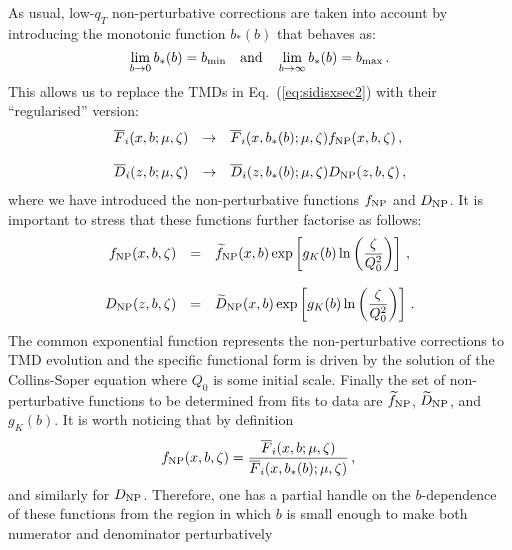 \documentclass[10pt,a4paper]{article}
\begin{document}
As usual, low-$q_T$ non-perturbative corrections are taken into
account by introducing the monotonic function $b_*(b)$ that behaves
as:
\begin{equation}
  \lim_{b\rightarrow 0}
  b_*(b) = b_{\rm min}\quad\mbox{and}\quad\lim_{b\rightarrow \infty}
  b_*(b) = b_{\rm max}\,.
\end{equation}
This allows us to replace the TMDs in Eq.~(\ref{eq:sidisxsec2}) with
their ``regularised'' version:
\begin{equation}\label{eq:fandDNP}
\begin{array}{rcl}
  \overline{F}_i(x,b;\mu,\zeta) &\rightarrow&
  \overline{F}_i(x,b_*(b);\mu,\zeta) f_{\rm NP}(x,b,\zeta)\,,\\
\\
  \overline{D}_i(z,b;\mu,\zeta) &\rightarrow&
  \overline{D}_i(z,b_*(b);\mu,\zeta) D_{\rm NP}(z,b,\zeta)\,,
\end{array}
\end{equation}
where we have introduced the non-perturbative functions $f_{\rm NP}$
and $D_{\rm NP}$. It is important to stress that these functions
further factorise as follows:
\begin{equation}\label{NPfuncts}
\begin{array}{rcl}
f_{\rm NP}(x,b,\zeta)&=&\displaystyle\widetilde{f}_{\rm NP}(x,b)\exp\left[g_K(b)\ln\left(\frac{\zeta}{Q_0^2}\right)\right]\,,\\
\\
D_{\rm NP}(z,b,\zeta) &=&\displaystyle\widetilde{D}_{\rm NP}(x,b)\exp\left[g_K(b)\ln\left(\frac{\zeta}{Q_0^2}\right)\right]\,.
\end{array}
\end{equation}
The common exponential function represents the non-perturbative
corrections to TMD evolution and the specific functional form is
driven by the solution of the Collins-Soper equation where $Q_0$ is
some initial scale. Finally the set of non-perturbative functions to
be determined from fits to data are $\widetilde{f}_{\rm NP}$,
$\widetilde{D}_{\rm NP}$, and $g_K(b)$. It is worth noticing that by definition
\begin{equation}
 f_{\rm NP}(x,b,\zeta) = \frac{\overline{F}_i(x,b;\mu,\zeta)}{\overline{F}_i(x,b_*(b);\mu,\zeta)} \,,\\
\end{equation}
and similarly for $D_{\rm NP}$. Therefore, one has a partial handle on
the $b$-dependence of these functions from the region in which $b$ is
small enough to make both numerator and denominator perturbatively
\end{document}
